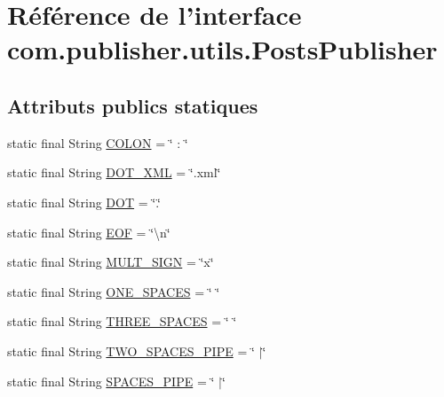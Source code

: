 \hypertarget{interfacecom_1_1publisher_1_1utils_1_1PostsPublisher}{\section{Référence de l'interface com.\-publisher.\-utils.\-Posts\-Publisher}
\label{interfacecom_1_1publisher_1_1utils_1_1PostsPublisher}
}
\subsection*{Attributs publics statiques}
\begin{DoxyCompactItemize}
\item 
static final String \hyperlink{interfacecom_1_1publisher_1_1utils_1_1PostsPublisher_a9ae26b0ce9e748867d3bda72a4686224}{C\-O\-L\-O\-N} = \char`\"{} \-: \char`\"{}
\item 
static final String \hyperlink{interfacecom_1_1publisher_1_1utils_1_1PostsPublisher_ac17a7c83a2ad79c31423731cf59c0818}{D\-O\-T\-\_\-\-X\-M\-L} = \char`\"{}.xml\char`\"{}
\item 
static final String \hyperlink{interfacecom_1_1publisher_1_1utils_1_1PostsPublisher_a661d60220f5109d8469252bd9d636946}{D\-O\-T} = \char`\"{}.\char`\"{}
\item 
static final String \hyperlink{interfacecom_1_1publisher_1_1utils_1_1PostsPublisher_a80980d1b6eff8ea4d04fe4b277998b38}{E\-O\-F} = \char`\"{}\textbackslash{}n\char`\"{}
\item 
static final String \hyperlink{interfacecom_1_1publisher_1_1utils_1_1PostsPublisher_aa93d20e80e4b59d18e23eb97357b5809}{M\-U\-L\-T\-\_\-\-S\-I\-G\-N} = \char`\"{}x\char`\"{}
\item 
static final String \hyperlink{interfacecom_1_1publisher_1_1utils_1_1PostsPublisher_aa3a472920abb87cef8080be7b1c46888}{O\-N\-E\-\_\-\-S\-P\-A\-C\-E\-S} = \char`\"{} \char`\"{}
\item 
static final String \hyperlink{interfacecom_1_1publisher_1_1utils_1_1PostsPublisher_a5e4d6f670b84bad6abf929e7729ca44c}{T\-H\-R\-E\-E\-\_\-\-S\-P\-A\-C\-E\-S} = \char`\"{} \char`\"{}
\item 
static final String \hyperlink{interfacecom_1_1publisher_1_1utils_1_1PostsPublisher_a1e30d1160b9457a8a7ba7d640a1438f5}{T\-W\-O\-\_\-\-S\-P\-A\-C\-E\-S\-\_\-\-P\-I\-P\-E} = \char`\"{} $\vert$\char`\"{}
\item 
static final String \hyperlink{interfacecom_1_1publisher_1_1utils_1_1PostsPublisher_af161f5f9e79cac9c5edb2cb9340fb7da}{S\-P\-A\-C\-E\-S\-\_\-\-P\-I\-P\-E} = \char`\"{} $\vert$\char`\"{}

\end{DoxyCompactItemize}
